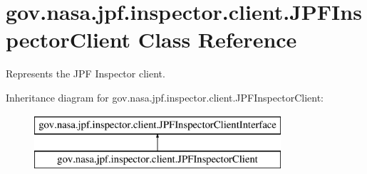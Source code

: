 \hypertarget{classgov_1_1nasa_1_1jpf_1_1inspector_1_1client_1_1_j_p_f_inspector_client}{}\section{gov.\+nasa.\+jpf.\+inspector.\+client.\+J\+P\+F\+Inspector\+Client Class Reference}
\label{classgov_1_1nasa_1_1jpf_1_1inspector_1_1client_1_1_j_p_f_inspector_client}


Represents the J\+PF Inspector client.  


Inheritance diagram for gov.\+nasa.\+jpf.\+inspector.\+client.\+J\+P\+F\+Inspector\+Client\+:\begin{figure}[H]
\begin{center}
\leavevmode
\includegraphics[height=2.000000cm]{classgov_1_1nasa_1_1jpf_1_1inspector_1_1client_1_1_j_p_f_inspector_client}
\end{center}
\end{figure}
